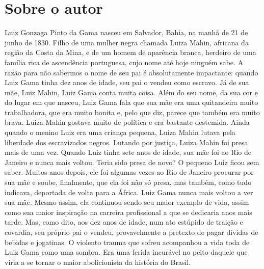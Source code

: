 
\section{Sobre o autor}

Luiz Gonzaga Pinto da Gama nasceu em Salvador, Bahia, na manhã
de 21 de junho de 1830. Filho de uma mulher negra chamada Luiza Mahin,
africana da região da Costa da Mina, e de um homem de aparência branca,
herdeiro de uma família rica de ascendência portuguesa, cujo nome até
hoje ninguém sabe. A razão para não sabermos o nome de seu pai é
absolutamente impactante: quando Luiz Gama tinha dez anos de idade, seu
pai o vendeu como escravo. Já de sua mãe, Luiz Mahin, Luiz Gama conta
muita coisa. Além do seu nome, da sua cor e do lugar em que nasceu, Luiz
Gama fala que sua mãe era uma quitandeira muito trabalhadora, que era
muito bonita e, pelo que diz, parece que também era muito brava. Luiza
Mahin gostava muito de política e era bastante destemida. Ainda quando o
menino Luiz era uma criança pequena, Luiza Mahin lutava pela liberdade
dos escravizados negros. Lutando por justiça, Luiza Mahin foi presa mais
de uma vez. Quando Luiz tinha sete anos de idade, sua mãe foi ao Rio de
Janeiro e nunca mais voltou. Teria sido presa de novo? O pequeno Luiz
ficou sem saber. Muitos anos depois, ele foi algumas vezes ao Rio de
Janeiro procurar por sua mãe e soube, finalmente, que ela foi não só
presa, mas também, como tudo indicava, deportada de volta para a África.
Luiz Gama nunca mais voltou a ver sua mãe. Mesmo assim, ela continuou
sendo seu maior exemplo de vida, assim como sua maior inspiração na
carreira profissional a que se dedicaria anos mais tarde. Mas, como
dito, aos dez anos de idade, num ato estúpido de traição e covardia, seu
próprio pai o vendeu, provavelmente a pretexto de pagar dívidas de
bebidas e jogatinas. O violento trauma que sofreu acompanhou a vida toda
de Luiz Gama como uma sombra. Era uma ferida incurável no peito daquele
que viria a se tornar o maior abolicionista da história do Brasil.

